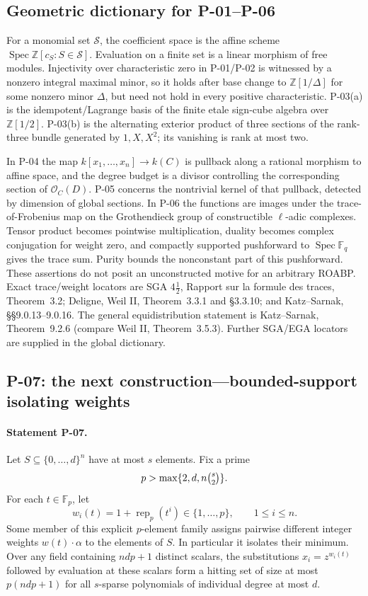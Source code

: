\subsection{Geometric dictionary for P-01--P-06}
For a monomial set $\mathcal S$, the coefficient space is the affine scheme $\operatorname{Spec}\mathbb Z[c_S:S\in\mathcal S]$. Evaluation on a finite set is a linear morphism of free modules. Injectivity over characteristic zero in P-01/P-02 is witnessed by a nonzero integral maximal minor, so it holds after base change to $\mathbb Z[1/\Delta]$ for some nonzero minor $\Delta$, but need not hold in every positive characteristic. P-03(a) is the idempotent/Lagrange basis of the finite etale sign-cube algebra over $\mathbb Z[1/2]$. P-03(b) is the alternating exterior product of three sections of the rank-three bundle generated by $1,X,X^2$; its vanishing is rank at most two.

In P-04 the map $k[x_1,\ldots,x_n]\to k(C)$ is pullback along a rational morphism to affine space, and the degree budget is a divisor controlling the corresponding section of $\mathcal O_C(D)$. P-05 concerns the nontrivial kernel of that pullback, detected by dimension of global sections. In P-06 the functions are images under the trace-of-Frobenius map on the Grothendieck group of constructible $\ell$-adic complexes. Tensor product becomes pointwise multiplication, duality becomes complex conjugation for weight zero, and compactly supported pushforward to $\operatorname{Spec}\mathbb F_q$ gives the trace sum. Purity bounds the nonconstant part of this pushforward. These assertions do not posit an unconstructed motive for an arbitrary ROABP. Exact trace/weight locators are SGA $4\frac12$, Rapport sur la formule des traces, Theorem~3.2; Deligne, Weil II, Theorem~3.3.1 and \S3.3.10; and Katz--Sarnak, \S\S9.0.13--9.0.16. The general equidistribution statement is Katz--Sarnak, Theorem~9.2.6 (compare Weil II, Theorem~3.5.3). Further SGA/EGA locators are supplied in the global dictionary.

\subsection{P-07: the next construction---bounded-support isolating weights}
\paragraph{Statement P-07.}
Let $S\subseteq\{0,\ldots,d\}^n$ have at most $s$ elements. Fix a prime
\[
 p>\max\{2,d,n\tbinom{s}{2}\}.
\]
For each $t\in\mathbb F_p$, let
\[
 w_i(t)=1+\operatorname{rep}_p(t^i)\in\{1,\ldots,p\},\qquad 1\le i\le n.
\]
Some member of this explicit $p$-element family assigns pairwise different integer weights $w(t)\cdot\alpha$ to the elements of $S$. In particular it isolates their minimum. Over any field containing $ndp+1$ distinct scalars, the substitutions $x_i=z^{w_i(t)}$ followed by evaluation at these scalars form a hitting set of size at most $p(ndp+1)$ for all $s$-sparse polynomials of individual degree at most $d$.
